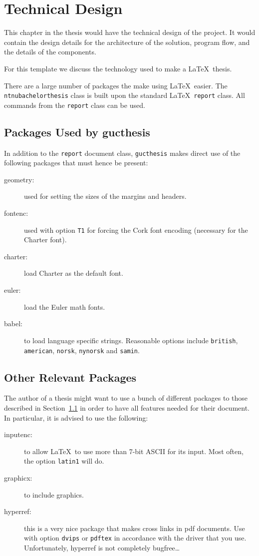 \chapter{Technical Design}
\label{chap:technical}

This chapter in the thesis would have the technical design of the project.  It would contain the design details for the architecture of the solution, program flow, and the details of the components.

For this template we discuss the technology used to make a \LaTeX\ thesis.

There are a large number of packages the make using \LaTeX\ easier.
The \texttt{ntnubachelorthesis} class is built upon the standard \LaTeX\
\texttt{report} class. All commands from the \texttt{report} class can
be used.

\section{Packages Used by gucthesis}
\label{sec:packages}
In addition to the \texttt{report} document class,
\texttt{gucthesis} makes direct use of the following packages
that must hence be present:
\begin{description}
	\item[geometry:] used for setting the sizes of the margins and
  	headers.
	\item[fontenc:] used with option \texttt{T1} for forcing the Cork font
  	encoding (necessary for the Charter font).
	\item[charter:] load Charter as the default font.
	\item[euler:] load the Euler math fonts.
	\item[babel:] to load language specific strings. Reasonable options
	  include \texttt{british}, \texttt{american}, \texttt{norsk},
	  \texttt{nynorsk} and \texttt{samin}.
\end{description}

\section{Other Relevant Packages}
\label{sec:otherpackages}

The author of a thesis might want to use a bunch of different packages
to those described in Section~\ref{sec:packages} in order to have all features needed for their document. 
In particular, it is advised to use the following:
\begin{description}
	\item[inputenc:] to allow \LaTeX\ to use more than 7-bit ASCII for its
	  input. Most often, the option \texttt{latin1} will do.
	\item[graphicx:] to include graphics.
	\item[hyperref:] this is a very nice package that makes cross links in
	  pdf documents. Use with option \texttt{dvips} or \texttt{pdftex}
	  in accordance with the driver that you use. Unfortunately, hyperref
	  is not completely bugfree\dots
\end{description}

